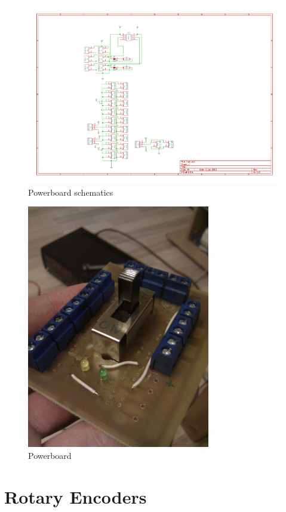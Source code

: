\documentclass[12pt]{article}
\begin{document}
\begin{figure}[h]
\begin{center}
\includegraphics[width=20cm,angle=-90]{pic/powerboard}
\caption{Powerboard schematics}
\end{center}
\label{figpowerboardscm}
\end{figure}

\begin{figure}[h]
\begin{center}
\includegraphics[width=8cm]{pic/powerboardr.jpg}
\caption{Powerboard}
\end{center}
\label{figpowerboardr}
\end{figure}


\section{Rotary Encoders} %
\end{document}
